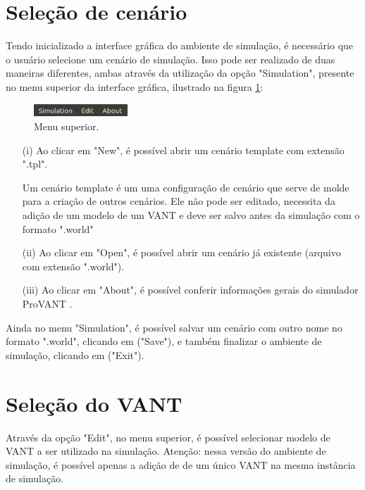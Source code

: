 \section{Seleção de cenário}

Tendo inicializado a interface gráfica do ambiente de simulação, é necessário que o usuário selecione um cenário de simulação. Isso pode ser realizado de duas maneiras diferentes, ambas através da utilização da opção "Simulation", presente no menu superior da interface gráfica, ilustrado na figura \ref{2}: 

\begin{figure}[!ht]
	\centering
	\includegraphics[width=100pt]{figuras/2.png}
	\caption{Menu superior.}
	\label{2}
\end{figure}

\begin{itemize}
	\item[(i)] Ao clicar em "New", é possível abrir um cenário template com extensão ".tpl".
	
	Um cenário template é um uma configuração de cenário que serve de molde para a criação de outros cenários. Ele não pode ser editado, necessita da adição de um modelo de um VANT e deve ser salvo antes da simulação com o formato ".world"
	 
	\item[(ii)] Ao clicar em "Open", é possível abrir um cenário já existente (arquivo com extensão ".world").  
	
	\item[(iii)] Ao clicar em "About", é possível conferir informações gerais do simulador ProVANT .  
\end{itemize}
  
Ainda no menu "Simulation", é possível salvar um cenário com outro nome no formato ".world", clicando em ("Save"), e também finalizar o ambiente de simulação, clicando em ("Exit").

\section{Seleção do VANT}

Através da opção "Edit", no menu superior, é possível selecionar modelo de VANT a ser utilizado na simulação. Atenção: nessa versão do ambiente de simulação, é possível apenas a adição de de um único VANT na mesma instância de simulação.

